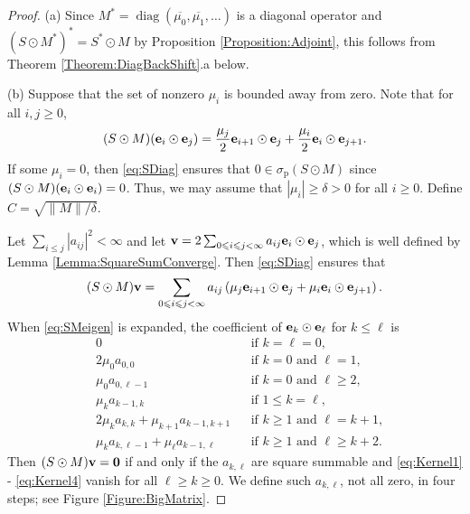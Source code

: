\documentclass[10pt,reqno]{amsart}
\newcommand{\0}{{\color{lightgray}0}}
\renewcommand{\leq}{\leqslant}
\renewcommand{\geq}{\geqslant}
\newcommand{\diag}{\operatorname{diag}}
\newcommand{\norm}[1]{\| #1 \|}
\renewcommand{\vec}[1]{{\bf #1}}
\theoremstyle{definition}
\numberwithin{equation}{section}
\begin{document}
\begin{proof}
(a) Since $M^* = \diag(\overline{\mu_0},\overline{\mu_1},\ldots)$ is a diagonal operator
and  $(S \odot M^*)^* = S^* \odot M$ by Proposition \ref{Proposition:Adjoint}, this follows from 
Theorem \ref{Theorem:DiagBackShift}.a below.

\medskip\noindent(b) 
Suppose that the set of nonzero $\mu_i$ is bounded away from zero. Note that for all $i,j \geq 0$,
\begin{equation}\label{eq:SDiag}
(S \odot M)({\vec{e}_i} \odot {\vec{e}_j}) 
= \frac{\mu_j}{2}{\vec{e}_{i+1}} \odot {\vec{e}_j}+\frac{\mu_i}{2}{\vec{e}_i} \odot {\vec{e}_{j+1}}.
\end{equation}
If some $\mu_i = 0$, then \eqref{eq:SDiag} ensures that $0 \in \sigma_{\mathrm{p}}(S \odot M)$
since $(S \odot M)( \vec{e}_i \odot \vec{e}_i) = 0 $. 
Thus, we may assume that $|\mu_i| \geq \delta > 0$ for all $i\geq 0$.  Define $C = \sqrt{\norm{M}/\delta}$.

Let $\sum_{i \leq j } | a_{ij}|^2 < \infty$ and let 
$\vec{v} = 2\sum_{0 \leq i \leq j< \infty} a_{ij} \vec{e}_i \odot \vec{e}_j$,
which is well defined by Lemma \ref{Lemma:SquareSumConverge}. Then \eqref{eq:SDiag} ensures that
\begin{equation}\label{eq:SMeigen}
    (S \odot M) \vec{v} = \sum_{0 \leq i \leq j< \infty} a_{ij}\left( \mu_j \vec{e}_{i+1}\odot \vec{e}_j + \mu_i \vec{e}_i \odot \vec{e}_{j+1} \right).
\end{equation}
When \eqref{eq:SMeigen} is expanded, the coefficient of $\vec{e}_k \odot \vec{e}_{\ell}$ for $k \leq \ell$ is
\begin{align}
	&0 && \text{if $k = \ell = 0$}, \\
    & 2\mu_0 a_{0, 0}  &&\text{if $k=0$ and $\ell = 1$}, \label{eq:Kernel0}\\
    & \mu_0 a_{0, \ell-1}  &&\text{if $k=0$ and $\ell \geq 2$}, \label{eq:Kernel1}\\
    &\mu_k a_{k-1, k}   &&\text{if $1 \leq k=\ell$}, \label{eq:Kernel2}\\
     &2\mu_k a_{k, k}  + \mu_{k+1} a_{k-1, k+1}  &&\text{if $k \geq 1$ and $\ell = k+1$}, \label{eq:Kernel3}\\
    &\mu_{k} a_{k, \ell-1}  + \mu_{\ell} a_{k-1, \ell}  &&\text{if $k \geq 1$ and $\ell \geq k+2$}.\label{eq:Kernel4}
\end{align}
Then $(S \odot M)\vec{v} = \vec{0}$ if and only if 
the $a_{k,\ell}$ are square summable and \eqref{eq:Kernel1} - \eqref{eq:Kernel4} vanish for all $\ell \geq k \geq 0$.  We define such $a_{k,\ell}$, not all zero, in four steps; see
Figure \ref{Figure:BigMatrix}.


\end{proof}
\end{document}
